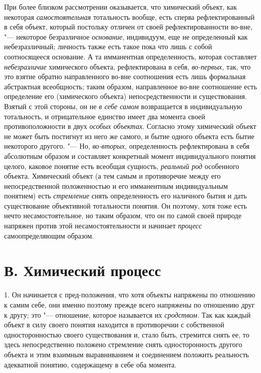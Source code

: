{{При более близком рассмотрении оказывается, что химический
объект, как некоторая
{\em самостоятельная}
тотальность вообще, есть сперва рефлектированный в себя
объект, который постольку отличен от своей рефлектированности во-вне, "---
некоторое безразличное
{\em основание},
индивидуум, еще не определенный как небезразличный; личность
также есть такое пока что лишь с собой соотносящееся
основание.
А та имманентная определенность, которая составляет
{\em небезразличие}
химического объекта, рефлектирована в себя,
{\em во-первых}, так, что
это взятие обратно направленного во-вне соотношения есть лишь формальная
абстрактная всеобщность; таким образом, направленное во-вне соотношение
есть определение его (химического объекта) непосредственности и
существования. Взятый с этой стороны, он не
{\em в себе самом}
возвращается в индивидуальную тотальность, и отрицательное
единство имеет два момента своей противоположности в двух
{\em особых объектах}.
Согласно этому химический объект не может быть постигнут из
него же самого, и бытие одного объекта есть бытие некоторого другого. "---
Но, {\em во-вторых},
определенность рефлектирована в себя абсолютным образом и
составляет конкретный момент индивидуального понятия целого, каковое
понятие есть всеобщая сущность,
{\em реальный род}
особенного объекта. Химический объект (а тем самым и
противоречие между его непосредственной положенностью и его имманентным
индивидуальным понятием) есть
{\em стремление} снять
определенность его наличного бытия и дать существование объективной
тотальности понятия. Он поэтому, хотя тоже есть нечто несамостоятельное, но
таким образом, что он по самой своей природе напряжен против этой
несамостоятельности и начинает
{\em процесс}
самоопределяющим образом.

\section[В. Химический процесс]{В. Химический процесс}
1. Он начинается с пред-положения, что хотя объекты напряжены
по отношению к самим себе, они именно поэтому прежде всего напряжены по
отношению друг к другу; это "--- отношение, которое называется
их {\em сродством}. Так
как каждый объект в силу своего понятия находится в противоречии с
собственной односторонностью своего существования и, стало быть, стремится
снять ее, то здесь непосредственно положено стремление снять
односторонность другого объекта и этим взаимным выравниванием и соединением
положить реальность адекватной понятию, содержащему в себе оба момента.

}}
